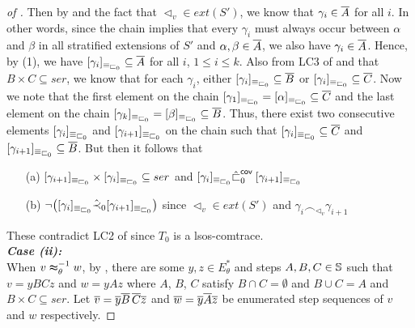 \documentclass{llncs}
\begin{document}
\begin{proof}[of ]
Then by  and the fact that $\lhd_v\in ext(S')$, we know that $\gamma_i \in \overline{A}$ for all $i$. In other words, since the chain  implies that every $\gamma_i$ must always occur between $\alpha$ and $\beta$ in all stratified extensions of $S'$ and $\alpha,\beta \in \overline{A}$, we also have $\gamma_i \in \overline{A}$. Hence, by  (1), we have $[\gamma_i]_{\equiv_{\sqsubset_{0}}}\subseteq \overline{A}$ for all $i$, $1\le i \le k$. Also from \textsf{LC3} of  and that $B\times C \subseteq ser$, we know that for each $\gamma_i$, either $[\gamma_i]_{\equiv_{\sqsubset_{0}}}\subseteq \overline{B}$ or $[\gamma_i]_{\equiv_{\sqsubset_{0}}}\subseteq \overline{C}$. Now we note  that the first element on the chain $[\gamma_1]_{\equiv_{\sqsubset_{0}}}=[\alpha]_{\equiv_{\sqsubset_{0}}}\subseteq \overline{C}$ and the last element on the chain $[\gamma_k]_{\equiv_{\sqsubset_{0}}}=[\beta]_{\equiv_{\sqsubset_{0}}}\subseteq \overline{B}$. Thus, there exist two consecutive elements $[\gamma_i]_{\equiv_{\sqsubset_{0}}}$ and $[\gamma_{i+1}]_{\equiv_{\sqsubset_{0}}}$ on the chain such that $[\gamma_i]_{\equiv_{\sqsubset_{0}}}\subseteq \overline{C}$ and $[\gamma_{i+1}]_{\equiv_{\sqsubset_{0}}}\subseteq \overline{B}$. But then it follows that
\begin{itemize}
 \item[(a)] $[\gamma_{i+1}]_{\equiv_{\sqsubset_{0}}}\times [\gamma_i]_{\equiv_{\sqsubset_{0}}}\subseteq ser$ and $[\gamma_i]_{\equiv_{\sqsubset_{0}}} {\hat{\sqsubset}_{0}}^{\mathsf{cov}\;} [\gamma_{i+1}]_{\equiv_{\sqsubset_{0}}}$
 \item[(b)] $\neg \bigl([\gamma_i]_{\equiv_{\sqsubset_{0}}} \hat{\prec}_{0} [\gamma_{i+1}]_{\equiv_{\sqsubset_{0}}}\bigr)$ since $\lhd_v\in ext(S')$ and $\gamma_i\frown_{\lhd_v}\gamma_{i+1}$
\end{itemize}
These contradict \textsf{LC2} of  since $T_0$ is a lsos-comtrace.\smallskip\\
\textit{\textbf{Case (ii):}} \\
When $v\thickapprox_{\theta}^{-1} w$, by , there are some $y,z\in E_{\theta}^*$ and steps $A,B,C\in \mathbb{S}$ such that $v=yBCz$ and $w=yAz$  where $A$, $B$, $C$ satisfy $B\cap C =\emptyset$ and $B\cup C = A$ and $B\times C\subseteq ser$. Let $\overline{v}=\overline{y}\overline{B}\,\overline{C}\overline{z}$ and $\overline{w}=\overline{y}\overline{A}\overline{z}$ be enumerated step sequences of $v$ and $w$ respectively. 


\end{proof}
\end{document}
